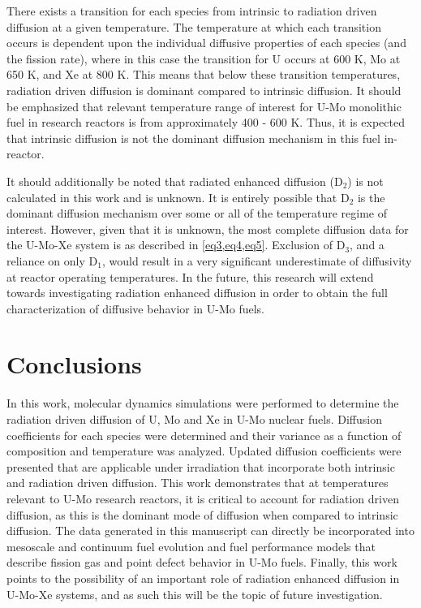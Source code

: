 \documentclass[review]{elsarticle}
\begin{document}
There exists a transition for each species from intrinsic to radiation driven diffusion at a given temperature. The temperature at which each transition occurs is dependent upon the individual diffusive properties of each species (and the fission rate), where in this case the transition for U occurs at 600 K, Mo at 650 K, and Xe at 800 K. This means that below these transition temperatures, radiation driven diffusion is dominant compared to intrinsic diffusion. It should be emphasized that relevant temperature range of interest for U-Mo monolithic fuel in research reactors is from approximately 400 - 600 K. Thus, it is expected that intrinsic diffusion is not the dominant diffusion mechanism in this fuel in-reactor.

It should additionally be noted that radiated enhanced diffusion (D$_2$) is not calculated in this work and is unknown. It is entirely possible that D$_2$ is the dominant diffusion mechanism over some or all of the temperature regime of interest. However, given that it is unknown, the most complete diffusion data for the U-Mo-Xe system is as described in \cref{eq3,eq4,eq5}. Exclusion of D$_3$, and a reliance on only D$_1$, would result in a very significant underestimate of diffusivity at reactor operating temperatures. In the future, this research will extend towards investigating radiation enhanced diffusion in order to obtain the full characterization of diffusive behavior in U-Mo fuels. 

\FloatBarrier

\section{Conclusions}

In this work, molecular dynamics simulations were performed to determine the radiation driven diffusion of U, Mo and Xe in U-Mo nuclear fuels. Diffusion coefficients for each species were determined and their variance as a function of composition and temperature was analyzed. Updated diffusion coefficients were presented that are applicable under irradiation that incorporate both intrinsic and radiation driven diffusion. This work demonstrates that at temperatures relevant to U-Mo research reactors, it is critical to account for radiation driven diffusion, as this is the dominant mode of diffusion when compared to intrinsic diffusion. The data generated in this manuscript can directly be incorporated into mesoscale and continuum fuel evolution and fuel performance models that describe fission gas and point defect behavior in U-Mo fuels. Finally, this work points to the possibility of an important role of radiation enhanced diffusion in U-Mo-Xe systems, and as such this will be the topic of future investigation. 
\end{document}
